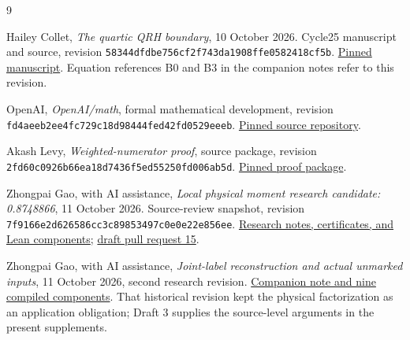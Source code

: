 \documentclass[11pt]{article}
\theoremstyle{definition}
\newcommand{\code}[1]{\texttt{\small #1}}
\begin{document}
\begin{thebibliography}{9}
\raggedright
{}
Hailey Collet, \emph{The quartic QRH boundary}, 10 October 2026.
Cycle25 manuscript and source, revision
\code{58344dfdbe756cf2f743da1908ffe0582418cf5b}.
\href{https://github.com/HaileyStorm/QuasiRiemannTracker/blob/58344dfdbe756cf2f743da1908ffe0582418cf5b/public/proofs/cycle25-quartic-20261010/paper.tex}{Pinned manuscript}.
Equation references B0 and B3 in the companion notes refer to this revision.

OpenAI, \emph{OpenAI/math}, formal mathematical development,
revision \code{fd4aeeb2ee4fc729c18d98444fed42fd0529eeeb}.
\href{https://github.com/openai/math/tree/fd4aeeb2ee4fc729c18d98444fed42fd0529eeeb}{Pinned source repository}.

Akash Levy, \emph{Weighted-numerator proof}, source package,
revision \code{2fd60c0926b66ea18d7436f5ed55250fd006ab5d}.
\href{https://github.com/akashlevy/QuasiRiemannTracker/tree/2fd60c0926b66ea18d7436f5ed55250fd006ab5d/proofs/akashlevy-20261009-weighted-numerator}{Pinned proof package}.

Zhongpai Gao, with AI assistance,
\emph{Local physical moment research candidate: 0.8748866},
11 October 2026. Source-review snapshot,
revision \code{7f9166e2d626586cc3c89853497c0e0e22e856ee}.
\href{https://github.com/Gaozhongpai/QuasiRiemannTracker/tree/7f9166e2d626586cc3c89853497c0e0e22e856ee/proofs/gao-local-moment-20261011}{Research notes, certificates, and Lean components};
\href{https://github.com/GTimG/QuasiRiemannTracker/pull/15}{draft pull request 15}.

Zhongpai Gao, with AI assistance,
\emph{Joint-label reconstruction and actual unmarked inputs},
11 October 2026, second research revision.
\href{https://github.com/Gaozhongpai/QuasiRiemannTracker/tree/gao-local-moment-source-review-20261011/proofs/gao-local-moment-20261011-v2}{Companion note and nine compiled components}.
That historical revision kept the physical factorization as an
application obligation; Draft 3 supplies the source-level arguments
in the present supplements.
\end{thebibliography}
\end{document}
